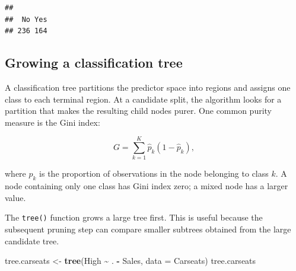 \documentclass[
  11pt,
]{article}
\newenvironment{Shaded}{\begin{snugshade}}{\end{snugshade}}
\newcommand{\AttributeTok}[1]{\textcolor[rgb]{0.13,0.29,0.53}{#1}}
\newcommand{\FunctionTok}[1]{\textcolor[rgb]{0.13,0.29,0.53}{\textbf{#1}}}
\newcommand{\NormalTok}[1]{#1}
\newcommand{\OtherTok}[1]{\textcolor[rgb]{0.56,0.35,0.01}{#1}}
\newcommand{\SpecialCharTok}[1]{\textcolor[rgb]{0.81,0.36,0.00}{\textbf{#1}}}
\begin{document}
\begin{Shaded}
\end{Shaded}

\begin{verbatim}
## 
##  No Yes 
## 236 164
\end{verbatim}

\subsection{Growing a classification
tree}\label{growing-a-classification-tree}

A classification tree partitions the predictor space into regions and
assigns one class to each terminal region. At a candidate split, the
algorithm looks for a partition that makes the resulting child nodes
purer. One common purity measure is the Gini index:

\[
G = \sum_{k=1}^{K} \hat p_k(1-\hat p_k),
\]

where \(\hat p_k\) is the proportion of observations in the node
belonging to class \(k\). A node containing only one class has Gini
index zero; a mixed node has a larger value.

The \texttt{tree()} function grows a large tree first. This is useful
because the subsequent pruning step can compare smaller subtrees
obtained from the large candidate tree.

\begin{Shaded}
\begin{Highlighting}[]
\NormalTok{tree.carseats }\OtherTok{\textless{}{-}} \FunctionTok{tree}\NormalTok{(High }\SpecialCharTok{\textasciitilde{}}\NormalTok{ . }\SpecialCharTok{{-}}\NormalTok{ Sales, }\AttributeTok{data =}\NormalTok{ Carseats)}
\NormalTok{tree.carseats}
\end{Highlighting}
\end{Shaded}
\end{document}

